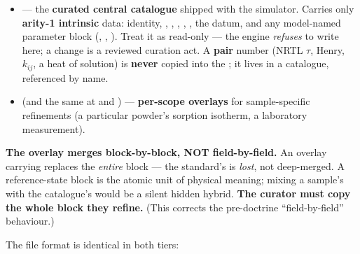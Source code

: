 \documentclass[11pt,a4paper]{article}
\begin{document}
\begin{itemize}[leftmargin=*]
  \item {} --- the
        \textbf{curated central catalogue} shipped with the simulator.  Carries
        only \textbf{arity-1 intrinsic} data: identity, ,
        , , , , the
         datum, and any model-named
        parameter block (, ,
        ).  Treat it as read-only --- the engine
        \emph{refuses} to write here; a change is a reviewed curation act.  A
        \textbf{pair} number (NRTL \(\tau\), Henry, \(k_{ij}\), a heat of
        solution) is \textbf{never} copied into the ; it lives in a
        catalogue, referenced by name.
  \item {} (and the same at
         and ) --- \textbf{per-scope overlays}
        for sample-specific refinements (a particular powder's sorption
        isotherm, a laboratory measurement).
\end{itemize}

\begin{keyidea}
\textbf{The overlay merges block-by-block, NOT field-by-field.}  An overlay
carrying  replaces the \emph{entire}
 block --- the standard's  is \emph{lost}, not
deep-merged.  A reference-state block is the atomic unit of physical meaning;
mixing a sample's  with the catalogue's  would be a
silent hidden hybrid.  \textbf{The curator must copy the whole block they
refine.}  (This corrects the pre-doctrine ``field-by-field'' behaviour.)
\end{keyidea}

The file format is identical in both tiers:
\end{document}
